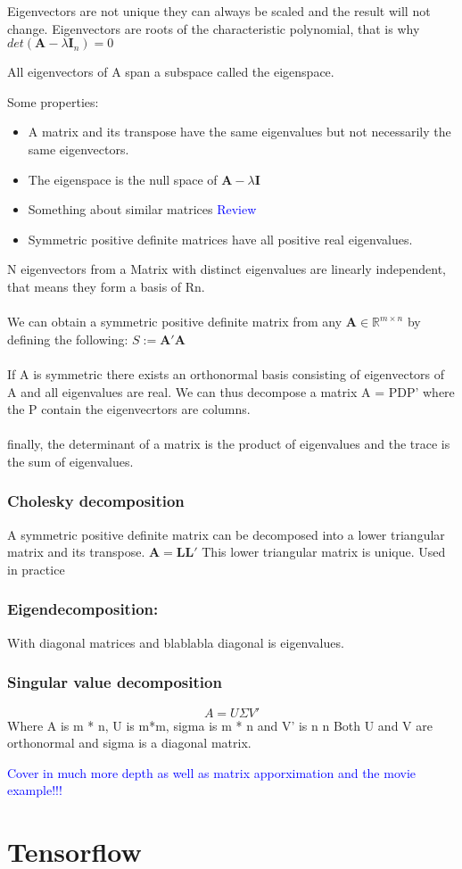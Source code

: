 \documentclass{article}
\newcommand{\tblue}[1]{\textcolor{blue}{#1}}
\begin{document}
Eigenvectors are not unique they can always be scaled and the result will not change.
Eigenvectors are roots of the characteristic polynomial, that is why $det(\textbf{A} - \lambda \textbf{I}_n) = 0$

All eigenvectors of A span a subspace called the eigenspace.

Some properties:
\begin{itemize}
    \item A matrix and its transpose have the same eigenvalues but not necessarily the same eigenvectors.
    \item The eigenspace is the null space of $\textbf{A} - \lambda \textbf{I}$ 
    \item Something about similar matrices \tblue{Review}
    \item Symmetric positive definite matrices have all positive real eigenvalues.
\end{itemize}
N eigenvectors from a Matrix with distinct eigenvalues are linearly independent, that means they form a basis of Rn.
\\
\\
We can obtain a symmetric positive definite matrix from any $\textbf{A} \in \mathbb{R}^{m \times n} $
by defining the following: $S := \textbf{A}'\textbf{A}$
\\
\\
If A is symmetric there exists an orthonormal basis consisting of eigenvectors of A and all eigenvalues are real.
We can thus decompose a matrix A = PDP' where the P contain the eigenvecrtors are columns.
\\
\\
finally, the determinant of a matrix is the product of eigenvalues and the trace is the sum of eigenvalues.

\subsubsection{Cholesky decomposition}

A symmetric positive definite matrix can be decomposed into a lower triangular matrix and its transpose.
$\textbf{A} = \textbf{L}\textbf{L}'$ 
This lower triangular matrix is unique.
Used in practice

\subsubsection{Eigendecomposition:}
With diagonal matrices and blablabla diagonal is eigenvalues.

\subsubsection{Singular value decomposition}
$$A = U \Sigma V'$$
Where A is m * n, U is m*m, sigma is m * n and V' is n n 
Both U and V are orthonormal and sigma is a diagonal matrix.

\tblue{Cover in much more depth as well as matrix apporximation and the movie example!!!}

\section{Tensorflow}
\end{document}
